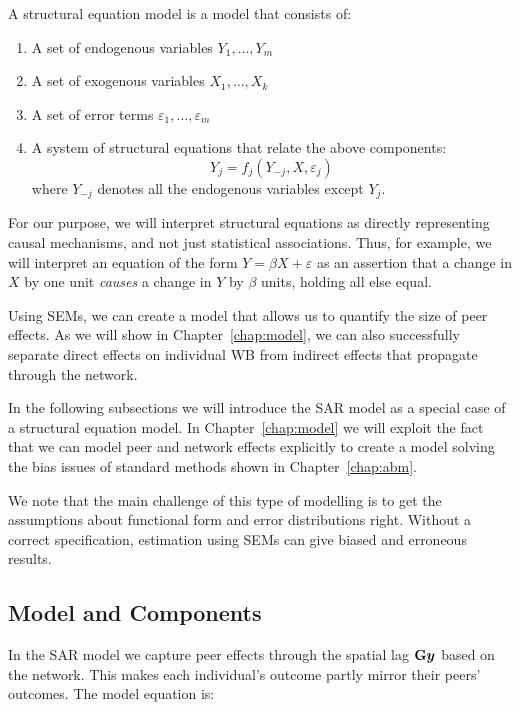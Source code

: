 \begin{definition}
A structural equation model is a model that consists of:
\begin{enumerate}
    \item A set of endogenous variables $Y_1, \ldots, Y_m$
    \item A set of exogenous variables $X_1, \ldots, X_k$
    \item A set of error terms $\varepsilon_1, \ldots, \varepsilon_m$
    \item A system of structural equations that relate the above components:
    \begin{equation}
        Y_j = f_j(Y_{-j}, X, \varepsilon_j)
    \end{equation}
    where $Y_{-j}$ denotes all the endogenous variables except $Y_j$.
\end{enumerate}
\end{definition}

For our purpose, we will interpret structural equations as directly representing causal mechanisms, and not just statistical associations. Thus, for example, we will interpret an equation of the form $Y = \beta X + \varepsilon$ as an assertion that a change in $X$ by one unit \emph{causes} a change in $Y$ by $\beta$ units, holding all else equal.

Using SEMs, we can create a model that allows us to quantify the size of peer effects. As we will show in Chapter~\ref{chap:model}, we can also successfully separate direct effects on individual WB from indirect effects that propagate through the network.

In the following subsections we will introduce the SAR model as a special case of a structural equation model. In Chapter~\ref{chap:model} we will exploit the fact that we can model peer and network effects explicitly to create a model solving the bias issues of standard methods shown in Chapter~\ref{chap:abm}.

We note that the main challenge of this type of modelling is to get the assumptions about functional form and error distributions right. Without a correct specification, estimation using SEMs can give biased and erroneous results.

\subsection{Model and Components}

In the SAR model we capture peer effects through the spatial lag $\mathbf{G}\bm{y}$ based on the network. This makes each individual's outcome partly mirror their peers' outcomes. The model equation is:

